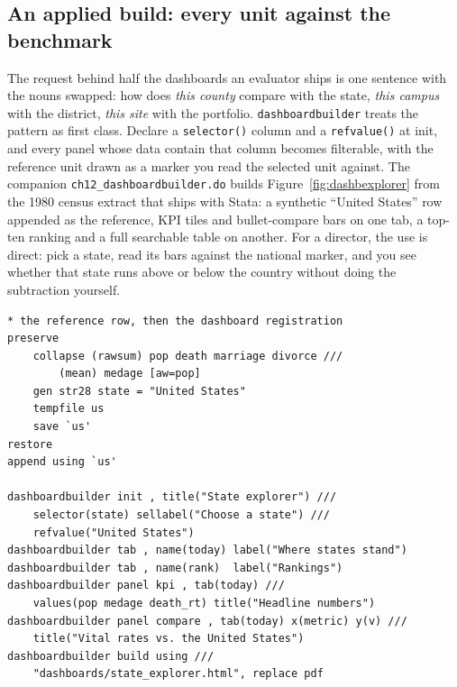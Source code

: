 \documentclass[
    a4paper,
    fontsize=10pt,
    twoside=true,
    numbers=noenddot,
]{kaobook}
\begin{document}
\subsection{An applied build: every unit against the benchmark}
The request behind half the dashboards an evaluator ships is one sentence with the nouns swapped: how does \emph{this county} compare with the state, \emph{this campus} with the district, \emph{this site} with the portfolio. \texttt{dashboardbuilder} treats the pattern as first class. Declare a \texttt{selector()} column and a \texttt{refvalue()} at init, and every panel whose data contain that column becomes filterable, with the reference unit drawn as a marker you read the selected unit against. The companion \texttt{ch12\_dashboardbuilder.do} builds Figure~\ref{fig:dashbexplorer} from the 1980 census extract that ships with Stata: a synthetic \enquote{United States} row appended as the reference, KPI tiles and bullet-compare bars on one tab, a top-ten ranking and a full searchable table on another. For a director, the use is direct: pick a state, read its bars against the national marker, and you see whether that state runs above or below the country without doing the subtraction yourself.
\par
{\footnotesize
\begin{verbatim}
* the reference row, then the dashboard registration
preserve
    collapse (rawsum) pop death marriage divorce ///
        (mean) medage [aw=pop]
    gen str28 state = "United States"
    tempfile us
    save `us'
restore
append using `us'

dashboardbuilder init , title("State explorer") ///
    selector(state) sellabel("Choose a state") ///
    refvalue("United States")
dashboardbuilder tab , name(today) label("Where states stand")
dashboardbuilder tab , name(rank)  label("Rankings")
dashboardbuilder panel kpi , tab(today) ///
    values(pop medage death_rt) title("Headline numbers")
dashboardbuilder panel compare , tab(today) x(metric) y(v) ///
    title("Vital rates vs. the United States")
dashboardbuilder build using ///
    "dashboards/state_explorer.html", replace pdf
\end{verbatim}
}
\end{document}
